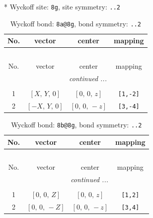\documentclass[fleqn,8pt]{jsarticle}
\begin{document}
* Wyckoff site: {\tt 8g}, site symmetry: {\tt ..2}
\renewcommand{\arraystretch}{1.2}
\begin{longtable}{cccc}
\caption{Wyckoff bond: {\tt 8a@8g}, bond symmetry: {\tt ..2}}
 \\
 \hline \hline
No. & vector & center & mapping \\ \hline \endfirsthead

\multicolumn{3}{l}{\tablename\ \thetable{}} \\
 \hline \hline
No. & vector & center & mapping \\ \hline \endhead

 \hline \hline
\multicolumn{3}{r}{\footnotesize\it continued ...} \\ \endfoot

 \hline \hline
\multicolumn{3}{r}{} \\ \endlastfoot

1 & $\left[ X,\, Y,\, 0 \right]$ & $\left[ 0,\, 0,\, z \right]$ & {\tt [1,-2]} \\ \hline
2 & $\left[ - X,\, Y,\, 0 \right]$ & $\left[ 0,\, 0,\, - z \right]$ & {\tt [3,-4]} \\
\end{longtable}
\renewcommand{\arraystretch}{1.2}
\begin{longtable}{cccc}
\caption{Wyckoff bond: {\tt 8b@8g}, bond symmetry: {\tt ..2}}
 \\
 \hline \hline
No. & vector & center & mapping \\ \hline \endfirsthead

\multicolumn{3}{l}{\tablename\ \thetable{}} \\
 \hline \hline
No. & vector & center & mapping \\ \hline \endhead

 \hline \hline
\multicolumn{3}{r}{\footnotesize\it continued ...} \\ \endfoot

 \hline \hline
\multicolumn{3}{r}{} \\ \endlastfoot

1 & $\left[ 0,\, 0,\, Z \right]$ & $\left[ 0,\, 0,\, z \right]$ & {\tt [1,2]} \\ \hline
2 & $\left[ 0,\, 0,\, - Z \right]$ & $\left[ 0,\, 0,\, - z \right]$ & {\tt [3,4]} \\
\end{longtable}
\renewcommand{\arraystretch}{1.2}
\end{document}
